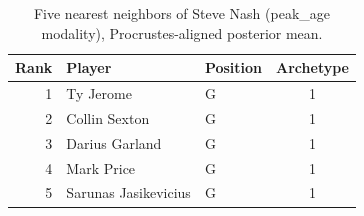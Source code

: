 \begin{table}[htbp]
  \centering\small
  \begin{tabular}{rllc}
    \toprule
    Rank & Player & Position & Archetype \\
    \midrule
    1 & Ty Jerome & G & 1 \\
    2 & Collin Sexton & G & 1 \\
    3 & Darius Garland & G & 1 \\
    4 & Mark Price & G & 1 \\
    5 & Sarunas Jasikevicius & G & 1 \\
    \bottomrule
  \end{tabular}
  \caption{Five nearest neighbors of Steve Nash (peak_age modality), Procrustes-aligned posterior mean.}
  \label{tab:Steve_Nash_neighbors_peak_age}
\end{table}

